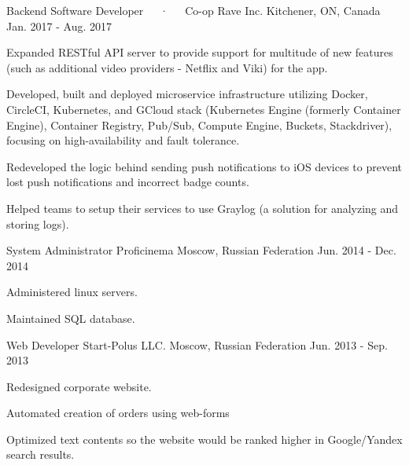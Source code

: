 

\begin{cventries}

\cventry
{Backend Software Developer~~~·~~~Co-op} %
{Rave Inc.} %
{Kitchener, ON, Canada} %
{Jan. 2017 - Aug. 2017} %
{
	\begin{cvitems} %
		\item {Expanded RESTful API server to provide support for multitude of new features (such as additional video providers - Netflix and Viki) for the app.}
		\item {Developed, built and deployed microservice infrastructure utilizing Docker, CircleCI, Kubernetes, and GCloud stack (Kubernetes Engine (formerly Container Engine), Container Registry, Pub/Sub, Compute Engine,  Buckets, Stackdriver), focusing on high-availability and fault tolerance.}
		\item {Redeveloped the logic behind sending push notifications to iOS devices to prevent lost push notifications and incorrect badge counts.}
		\item {Helped teams to setup their services to use Graylog (a solution for analyzing and storing logs).}
	\end{cvitems}
}

\cventry
{System Administrator} %
{Proficinema} %
{Moscow, Russian Federation} %
{Jun. 2014 - Dec. 2014} %
{
	\begin{cvitems} %
		\item {Administered linux servers.}
		\item {Maintained SQL database.}
	\end{cvitems}
}

  \cventry
    {Web Developer} %
    {Start-Polus LLC.} %
    {Moscow, Russian Federation} %
    {Jun. 2013 - Sep. 2013} %
    {
      \begin{cvitems} %
        \item {Redesigned corporate website.}
        \item {Automated creation of orders using web-forms}
        \item {Optimized text contents so the website would be ranked higher in Google/Yandex search results.}
      \end{cvitems}
    }
\end{cventries}
